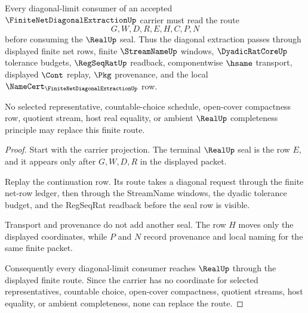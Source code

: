 \begin{theorem}
\label{thm:finite-net-diagonal-extraction-window-route}
Every diagonal-limit consumer of an accepted
$\FiniteNetDiagonalExtractionUp$ carrier must read the route
$$
G,W,D,R,E,H,C,P,N
$$
before consuming the $\RealUp$ seal. Thus the diagonal extraction passes
through displayed finite net rows, finite $\StreamNameUp$ windows,
$\DyadicRatCoreUp$ tolerance budgets, $\RegSeqRatUp$ readback,
componentwise $\hsame$ transport, displayed $\Cont$ replay, $\Pkg$
provenance, and the local $\NameCert_{\FiniteNetDiagonalExtractionUp}$ row.

No selected representative, countable-choice schedule, open-cover compactness
row, quotient stream, host real equality, or ambient $\RealUp$ completeness
principle may replace this finite route.
\end{theorem}
\begin{proof}
Start with the carrier projection. The terminal $\RealUp$ seal is the row $E$,
and it appears only after $G,W,D,R$ in the displayed packet.

Replay the continuation row. Its route takes a diagonal request through the
finite net-row ledger, then through the StreamName windows, the dyadic
tolerance budget, and the RegSeqRat readback before the seal row is visible.

Transport and provenance do not add another seal. The row $H$ moves only the
displayed coordinates, while $P$ and $N$ record provenance and local naming for
the same finite packet.

Consequently every diagonal-limit consumer reaches $\RealUp$ through the
displayed finite route. Since the carrier has no coordinate for selected
representatives, countable choice, open-cover compactness, quotient streams,
host equality, or ambient completeness, none can replace the route.
\end{proof}


